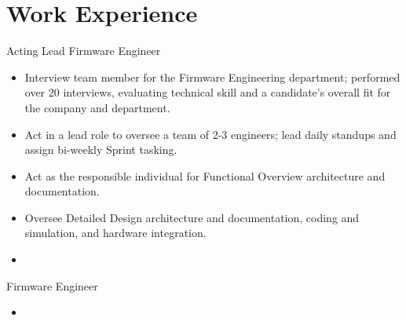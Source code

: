 \documentclass[10pt,final,sans]{resume}
\begin{document}
\section{Work Experience}
Acting Lead Firmware Engineer
\begin{itemize}
  \item Interview team member for the Firmware Engineering department; performed over 20 interviews, evaluating technical skill and a candidate's overall fit for the company and department. 
  \item Act in a lead role to oversee a team of 2-3 engineers; lead daily standups and assign bi-weekly Sprint tasking. 
  \item Act as the responsible individual for Functional Overview architecture and documentation.
  \item Oversee Detailed Design architecture and documentation, coding and simulation, and hardware integration. 
  \item 
\end{itemize} 

Firmware Engineer
\begin{itemize}
  \item
\end{itemize}

\end{document}
